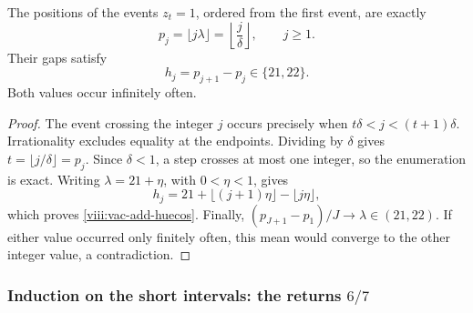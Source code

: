 \begin{theorem}
\label{viii:vac-add-teorema-primario}
The positions of the events \(z_t=1\), ordered from the first event, are exactly
\begin{equation}
 p_j=\lfloor j\lambda\rfloor
     =\left\lfloor\frac j\delta\right\rfloor,
 \qquad j\geq1.
 \label{viii:vac-add-posiciones}
\end{equation}
Their gaps satisfy
\begin{equation}
 h_j=p_{j+1}-p_j\in\{21,22\}.
 \label{viii:vac-add-huecos}
\end{equation}
Both values occur infinitely often.
\end{theorem}
\begin{proof}
The event crossing the integer \(j\) occurs precisely when \(t\delta<j<(t+1)\delta\). Irrationality excludes equality at the endpoints. Dividing by \(\delta\) gives \(t=\lfloor j/\delta\rfloor=p_j\). Since \(\delta<1\), a step crosses at most one integer, so the enumeration is exact. Writing \(\lambda=21+\eta\), with \(0<\eta<1\), gives
\[
 h_j=21+\lfloor(j+1)\eta\rfloor-\lfloor j\eta\rfloor,
\]
which proves \eqref{viii:vac-add-huecos}. Finally, \((p_{J+1}-p_1)/J\to\lambda\in(21,22)\). If either value occurred only finitely often, this mean would converge to the other integer value, a contradiction.
\end{proof}

\subsubsection{Induction on the short intervals: the returns \(6/7\)}
\label{viii:vac-add-secundarios}

